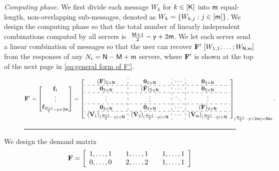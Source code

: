 \documentclass[conference,letterpaper]{IEEEtran}
\newcommand{\tikzmark}[1]{\tikz[overlay,remember picture] \node (#1) {};}
\begin{document}
  {\it Computing phase.}
  We first divide each message $W_k$ for $k \in [{\sf K}]$ into ${\sf m}$ equal-length, non-overlapping sub-messages, denoted as $W_k = \{W_{k,j} : j \in [{\sf m}]\}$.
We design the computing phase so that the total number of linearly independent combinations computed by all servers is $\ \frac {{\sf M} + 1}{2} - {\sf y} + 2{\sf m}$. We let each server send a linear combination of messages so that the user can recover ${\bf F}' \ [W_{1,1}; \ldots; W_{{\sf N},{\sf m}}]$ from the responses of any $N_{\rm r} = {\sf N} - {\sf M} +{\sf m}$ servers, where \( {\bf F}' \) is shown at the top of the next page in \eqref{eq:general form of F'}.
\begin{figure}
\begin{equation}
 {\bf F}' = \begin{bmatrix}
 \fv_1 \\
 \vdots \\
 \fv_{\frac{\Msf+1}{2}-\ysf+2\msf} 
 \end{bmatrix}
 =
\left[
\begin{array}{c:c:c:c}
 ({\bf F})_{2 \times \Nsf}  & {\bf 0}_{2 \times \Nsf}  & \cdots & {\bf 0}_{2 \times \Nsf}   \\ \hdashline
{\bf 0}_{2 \times \Nsf} &  ({\bf F})_{2 \times \Nsf}   & \cdots & {\bf 0}_{2 \times \Nsf}   \\ \hdashline 
 \vdots   & \vdots  &  \ddots & \vdots \\ \hdashline
 {\bf 0}_{2 \times \Nsf} &   {\bf 0}_{2 \times \Nsf}    & \cdots &  ({\bf F})_{2 \times \Nsf} \\ \hdashline
 ({\bf V}_{1})_{ (\frac{\Msf + 1}{2} - \ysf) \times \Nsf}  &  ({\bf V}_{2})_{ (\frac{\Msf + 1}{2} - \ysf) \times \Nsf}  &   \cdots   &   ({\bf V}_{\msf})_{ (\frac{\Msf + 1}{2} - \ysf) \times \Nsf} 
 \end{array}
\right]_{(\frac{\Msf + 1}{2} - \ysf + 2\msf) \times \Nsf\msf}.
\label{eq:general form of F'}
\end{equation}
\rule{\textwidth}{0.2pt} %
\end{figure}

We design the demand matrix 
\begin{equation}
\bf F = 
\begin{bmatrix}
\tikzmark{left4F} \textcolor{white}{0} 1 , \ldots , 1 \textcolor{white}{0} \tikzmark{right4F} & 
\tikzmark{left5F} \textcolor{white}{0} 1 , \ldots , 1 \textcolor{white}{0} \tikzmark{right5F} & 
\tikzmark{left6F} \textcolor{white}{0} 1 , \ldots , 1 \textcolor{white}{0} \tikzmark{right6F} \\
\textcolor{white}{0} 0 , \ldots , 0 \textcolor{white}{0} & 
\textcolor{white}{0} 2 , \ldots , 2 \textcolor{white}{0} & 
\textcolor{white}{0} 1 , \ldots , 1 \textcolor{white}{0} 
\end{bmatrix}
\label{eq: general of F}
\end{equation}
\end{document}
